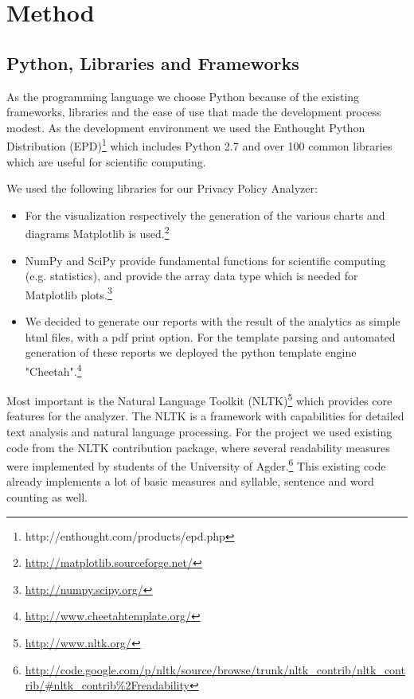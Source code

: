 \documentclass[runningheads,a4paper]{llncs}
\begin{document}
\section{Method}\label{sec:method}

\subsection{Python, Libraries and Frameworks} \label{sec:method_frameworks}
As the programming language we choose Python because of the existing frameworks, libraries and the ease of use that made the development process modest. As the development environment we used the Enthought Python Distribution (EPD)\footnote{http://enthought.com/products/epd.php} which includes Python 2.7 and over 100 common libraries which are useful for scientific computing. 

We used the following libraries for our Privacy Policy Analyzer:

\begin{itemize}
\item For the visualization respectively the generation of the various charts and diagrams Matplotlib is used.\footnote{\url{http://matplotlib.sourceforge.net/}}
\item NumPy and SciPy provide fundamental functions for scientific computing (e.g. statistics), and provide the array data type which is needed for Matplotlib plots.\footnote{\url{http://numpy.scipy.org/}}
\item We decided to generate our reports with the result of the analytics as simple html files, with a pdf print option. For the template parsing and automated generation of these reports we deployed the python template engine "Cheetah".\footnote{\url{http://www.cheetahtemplate.org/}}
\end{itemize}

Most important is the Natural Language Toolkit (NLTK)\footnote{\url{http://www.nltk.org/}} which provides core features for the analyzer. The NLTK is a framework with capabilities for detailed text analysis and natural language processing. 
For the project we used existing code from the NLTK contribution package, where several readability measures were implemented by students of the University of Agder.\footnote{\url{http://code.google.com/p/nltk/source/browse/trunk/nltk_contrib/nltk_contrib/#nltk_contrib\%2Freadability}}
This existing code already implements a lot of basic measures and syllable, sentence and word counting as well. 
\end{document}
